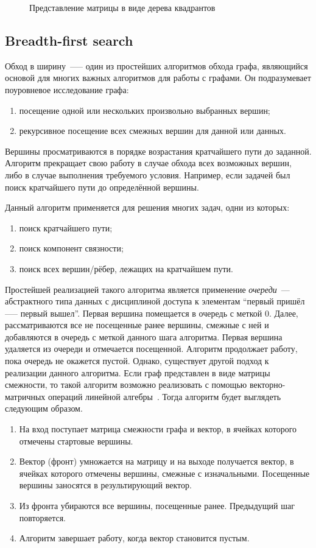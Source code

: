 \begin{figure}[ht]
    \centering
    \caption{Представление матрицы в виде дерева квадрантов}
    \label{fig:quadtree}
\end{figure}

\subsection{Breadth-first search}
Обход в ширину~—-- один из простейших алгоритмов обхода графа, являющийся основой для многих важных алгоритмов для работы с графами. Он подразумевает поуровневое исследование графа:
\begin{enumerate}
\item  посещение одной или нескольких произвольно выбранных вершин;
\item  рекурсивное посещение всех смежных вершин для данной или данных.
\end{enumerate}
Вершины просматриваются в порядке возрастания кратчайшего пути до заданной. Алгоритм прекращает свою работу в случае обхода всех возможных вершин, либо в случае выполнения требуемого условия. Например, если задачей был поиск кратчайшего пути до определённой вершины. 

Данный алгоритм применяется для решения многих задач, одни из которых:
\begin{enumerate}
    \item  поиск кратчайшего пути;
    \item  поиск компонент связности;
    \item  поиск всех вершин/рёбер, лежащих на кратчайшем пути.
\end{enumerate}

Простейшей реализацией такого алгоритма является применение \textit{очереди}~--- абстрактного типа данных с дисциплиной доступа к элементам \enquote{первый пришёл --— первый вышел}. Первая вершина помещается в очередь с меткой $0$. Далее, рассматриваются все не посещенные ранее вершины, смежные с ней и добавляются в очередь с меткой данного шага алгоритма. Первая вершина удаляется из очереди и отмечается посещенной. Алгоритм продолжает работу, пока очередь не окажется пустой. Однако, существует другой подход к реализации данного алгоритма. Если граф представлен в виде матрицы смежности, то такой алгоритм возможно реализовать с помощью векторно-матричных операций линейной алгебры~\cite{davis2018algorithm}. Тогда алгоритм будет выглядеть следующим образом.
\begin{enumerate}
    \item  На вход поступает матрица смежности графа и вектор, в ячейках которого отмечены стартовые вершины.
    \item  Вектор (фронт) умножается на матрицу и на выходе получается вектор, в ячейках которого отмечены вершины, смежные с изначальными. Посещенные вершины заносятся в результирующий вектор.
    \item  Из фронта убираются все вершины, посещенные ранее. Предыдущий шаг повторяется.
    \item  Алгоритм завершает работу, когда вектор становится пустым.
\end{enumerate}

